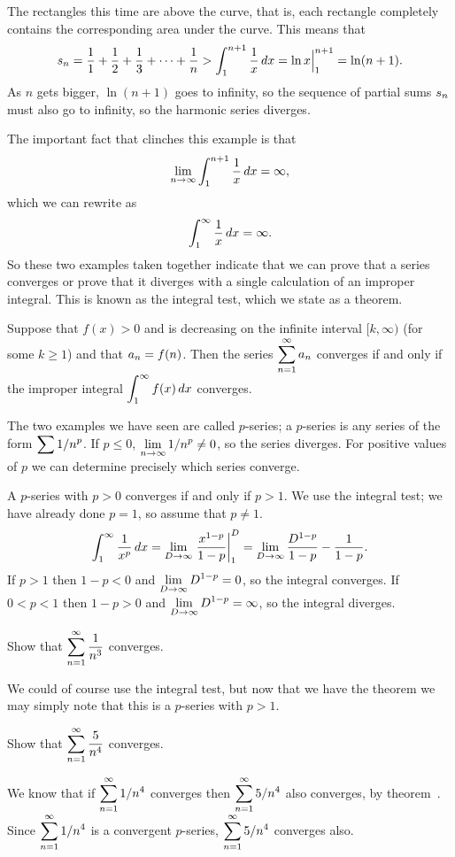 The rectangles this time are above the curve, that is, each rectangle
completely contains the corresponding area under the curve. This means
that 
$$s_n = {1\over 1}+{1\over 2}+{1\over 3}+\cdots+{1\over n}
> \int_1^{n+1} {1\over x}\,dx = \ln x\Big|_1^{n+1}=\ln(n+1).$$
As $n$ gets bigger, $\ln(n+1)$ goes to infinity, so the sequence of
partial sums $\displaystyle s_n$ must also go to infinity, so the harmonic series
diverges. 
\endexample

The important fact that clinches this example is that
$$\lim_{n\to\infty} \int_1^{n+1} {1\over x}\,dx = \infty,$$
which we can rewrite as
$$\int_1^\infty {1\over x}\,dx = \infty.$$
So these two examples taken together indicate that we can prove that a
series converges or prove that it diverges with a single calculation
of an improper integral. This is known as the {\dfont integral
  test\/}, 
which we state as a theorem.

\thm Suppose that $f(x)>0$ and is decreasing on the infinite interval
$[k,\infty)$ (for some $k\ge1$)
and that $\displaystyle a_n=f(n)$. Then the series
$\displaystyle\sum_{n=1}^\infty a_n$ converges if and only if the improper
integral $\displaystyle\int_{1}^\infty f(x)\,dx$ converges.
\endthmnoproof

The two examples we have seen are called
$p$-series; a $p$-series is
any series of the form $\displaystyle \sum 1/n^p$. If $p\le0$, $\displaystyle\lim_{n\to\infty}
1/n^p\not=0$, so the series diverges. For positive values of $p$ we
can determine precisely which series converge.

\thm A $p$-series with $p>0$ converges if and only if $p>1$.
\endthm
\proof
We use the integral test; we have already done $p=1$, so assume that
$p\not=1$.
$$
  \int_1^{\infty} {1\over x^p}\,dx=\lim_{D\to\infty} \left.{x^{1-p}\over
  1-p}\right|_{1}^D=\lim_{D\to\infty} {D^{1-p}\over 1-p}-{1\over 1-p}.
$$
If $p>1$ then $1-p<0$ and $\displaystyle\lim_{D\to\infty}D^{1-p}=0$, so the
  integral converges. If $0<p<1$ then $1-p>0$ and 
$\displaystyle\lim_{D\to\infty}D^{1-p}=\infty$, so the integral diverges.
\endproof

\example Show that $\displaystyle\sum_{n=1}^\infty {1\over {n^3}}$ converges. 
\par\nobreak\ssk\noindent
We could of course use
the integral test, but now that we have the theorem we may simply note
that this is a $p$-series with $p>1$.
\endexample

\example Show that $\displaystyle\sum_{n=1}^\infty {5\over n^4}$ converges. 
\par\nobreak\ssk\noindent
We know that if
$\displaystyle \sum_{n=1}^\infty 1/n^4$ converges then $\displaystyle \sum_{n=1}^\infty 5/n^4$
also converges, by theorem~. Since 
$\displaystyle \sum_{n=1}^\infty 1/n^4$ is a convergent $p$-series, 
 $\displaystyle \sum_{n=1}^\infty 5/n^4$ converges also.
\endexample


